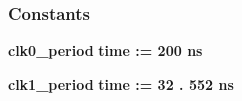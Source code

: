 \subsubsection*{Constants}
 \begin{DoxyCompactItemize}
\item 
{\bf clk0\+\_\+period} {\bfseries \textcolor{comment}{time}\textcolor{vhdlchar}{ }\textcolor{vhdlchar}{ }\textcolor{vhdlchar}{\+:}\textcolor{vhdlchar}{=}\textcolor{vhdlchar}{ }\textcolor{vhdlchar}{ }\textcolor{vhdlchar}{ } \textcolor{vhdldigit}{200} \textcolor{vhdlchar}{ }\textcolor{vhdlchar}{ns}\textcolor{vhdlchar}{ }} 
\item 
{\bf clk1\+\_\+period} {\bfseries \textcolor{comment}{time}\textcolor{vhdlchar}{ }\textcolor{vhdlchar}{ }\textcolor{vhdlchar}{\+:}\textcolor{vhdlchar}{=}\textcolor{vhdlchar}{ }\textcolor{vhdlchar}{ }\textcolor{vhdlchar}{ } \textcolor{vhdldigit}{32} \textcolor{vhdlchar}{.} \textcolor{vhdldigit}{552} \textcolor{vhdlchar}{ }\textcolor{vhdlchar}{ns}\textcolor{vhdlchar}{ }} 
\end{DoxyCompactItemize}
